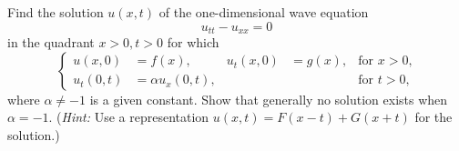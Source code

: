 \begin{problem}
  Find the solution \(u(x,t)\) of the one-dimensional wave equation
  \[
    u_{tt}-u_{xx}=0
  \]
  in the quadrant \(x>0,t>0\) for which
  \[
    \left\{
      \begin{aligned}
        u(x,0)&=f(x),&u_t(x,0)&=g(x),&\text{for \(x>0\),}\\
        u_t(0,t)&=\alpha u_x(0,t),&&&\text{for \(t>0\)},
      \end{aligned}
    \right.
  \]
  where \(\alpha\neq -1\) is a given constant. Show that generally no
  solution exists when \(\alpha=-1\). (\emph{Hint:} Use a representation
  \(u(x,t)=F(x-t)+G(x+t)\) for the solution.)
\end{problem}
\begin{solution}


\end{solution}
